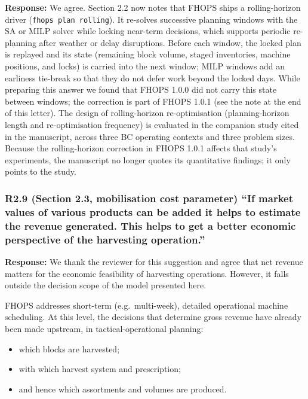 \textbf{Response:} We agree. Section 2.2 now notes that FHOPS ships a
rolling-horizon driver (\texttt{fhops\ plan\ rolling}). It re-solves
successive planning windows with the SA or MILP solver while locking
near-term decisions, which supports periodic re-planning after weather
or delay disruptions. Before each window, the locked plan is replayed
and its state (remaining block volume, staged inventories, machine
positions, and locks) is carried into the next window; MILP windows add
an earliness tie-break so that they do not defer work beyond the locked
days. While preparing this answer we found that FHOPS 1.0.0 did not
carry this state between windows; the correction is part of FHOPS 1.0.1
(see the note at the end of this letter). The design of rolling-horizon
re-optimisation (planning-horizon length and re-optimisation frequency)
is evaluated in the companion study cited in the manuscript, across
three BC operating contexts and three problem sizes. Because the
rolling-horizon correction in FHOPS 1.0.1 affects that study's
experiments, the manuscript no longer quotes its quantitative findings;
it only points to the study.

\subsubsection{R2.9 (Section 2.3, mobilisation cost parameter) ``If
market values of various products can be added it helps to estimate the
revenue generated. This helps to get a better economic perspective of
the harvesting
operation.''}\label{r2.9-section-2.3-mobilisation-cost-parameter-if-market-values-of-various-products-can-be-added-it-helps-to-estimate-the-revenue-generated.-this-helps-to-get-a-better-economic-perspective-of-the-harvesting-operation.}

\textbf{Response:} We thank the reviewer for this suggestion and agree
that net revenue matters for the economic feasibility of harvesting
operations. However, it falls outside the decision scope of the model
presented here.

FHOPS addresses short-term (e.g.~multi-week), detailed operational
machine scheduling. At this level, the decisions that determine gross
revenue have already been made upstream, in tactical-operational
planning:

\begin{itemize}
\tightlist
\item
  which blocks are harvested;
\item
  with which harvest system and prescription;
\item
  and hence which assortments and volumes are produced.
\end{itemize}

